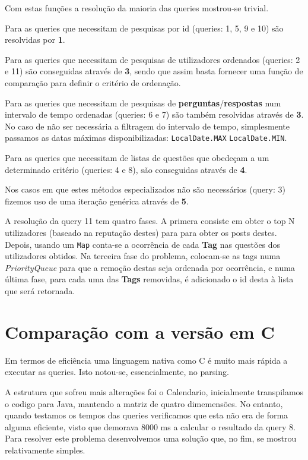 \documentclass[10pt,a4paper]{report}
\begin{document}
    Com estas funções a resolução da maioria das queries mostrou-se
    trivial.

    Para as queries que necessitam de pesquisas por id (queries: 1, 5, 9 e 10)
    são resolvidas por \textbf{1}.

    Para as queries que necessitam de pesquisas de utilizadores ordenados
    (queries: 2 e 11) são conseguidas através de \textbf{3}, sendo que assim
    basta fornecer uma função de comparação para definir o critério de
    ordenação.

    Para as queries que necessitam de pesquisas de
    \textbf{perguntas}/\textbf{respostas} num intervalo de tempo ordenadas
    (queries: 6 e 7) são também resolvidas através de \textbf{3}. No caso de não
    ser necessária a filtragem do intervalo de tempo, simplesmente passamos as
    datas máximas disponibilizadas: \texttt{LocalDate.MAX}
    \texttt{LocalDate.MIN}.

    Para as queries que necessitam de listas de questões que obedeçam a um
    determinado critério (queries: 4 e 8), são conseguidas através de
    \textbf{4}.

    Nos casos em que estes métodos especializados não são necessários (query: 3)
    fizemos uso de uma iteração genérica através de \textbf{5}.

    A resolução da query 11 tem quatro fases. A primera consiste em obter o top
    N utilizadores (baseado na reputação destes) para para obter os posts
    destes.
    Depois, usando um \texttt{Map} conta-se a ocorrência de cada
    \textbf{Tag} nas questões dos utilizadores obtidos. Na terceira fase do
    problema, colocam-se as tags numa \textit{PriorityQueue} para que a
    remoção destas seja ordenada por ocorrência, e numa última fase, para cada
    uma das \textbf{Tags} removidas, é adicionado o id desta à lista que será
    retornada.

\chapter{Comparação com a versão em C}
    Em termos de eficiência uma linguagem nativa como C é muito mais rápida a
    executar as queries. Isto notou-se, essencialmente, no parsing.

    A estrutura que sofreu mais alterações foi o Calendario, inicialmente
    transpilamos o codigo para Java, mantendo a matriz de quatro dimemensões.
    No entanto, quando testamos os tempos das queries verificamos que esta
    não era de forma alguma eficiente, visto que demorava 8000 ms a calcular
    o resultado da query 8. Para resolver este problema desenvolvemos uma
    solução que, no fim, se mostrou relativamente simples.
\end{document}
